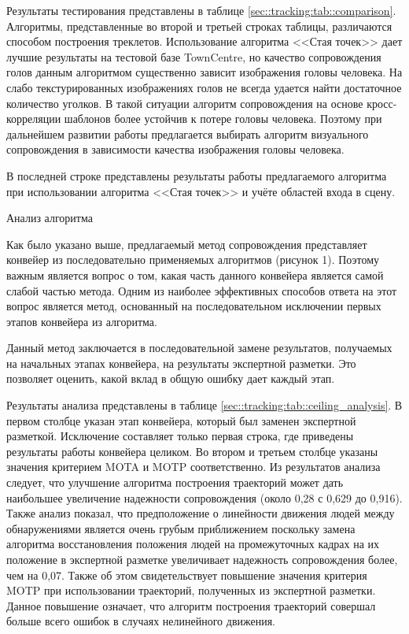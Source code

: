 Результаты тестирования представлены в таблице \ref{sec::tracking:tab::comparison}. Алгоритмы, представленные во второй и третьей строках таблицы, различаются способом построения треклетов. Использование алгоритма <<Стая точек>> дает лучшие результаты на тестовой базе TownCentre, но качество сопровождения голов данным алгоритмом существенно зависит изображения головы человека. На слабо текстурированных изображениях голов не всегда удается найти достаточное количество уголков. В такой ситуации алгоритм сопровождения на основе кросс-корреляции шаблонов более устойчив к потере головы человека. Поэтому при дальнейшем развитии работы предлагается выбирать алгоритм визуального сопровождения в зависимости качества изображения головы человека.

В последней строке представлены результаты работы предлагаемого алгоритма при использовании алгоритма <<Стая точек>> и учёте областей входа в сцену.

Анализ алгоритма

Как было указано выше, предлагаемый метод сопровождения представляет конвейер из последовательно применяемых алгоритмов (рисунок 1). Поэтому важным является вопрос о том, какая часть данного конвейера является самой слабой частью метода. Одним из наиболее эффективных способов ответа на этот вопрос является метод, основанный на последовательном
исключении первых этапов конвейера из алгоритма.

Данный метод заключается в последовательной замене результатов, получаемых на начальных этапах конвейера, на результаты экспертной разметки. Это позволяет оценить, какой вклад в общую ошибку дает каждый этап.

Результаты анализа представлены в таблице \ref{sec::tracking:tab::ceiling_analysis}. В первом столбце указан этап конвейера, который был заменен экспертной разметкой. Исключение составляет только первая строка, где приведены результаты работы конвейера целиком. Во втором и третьем столбце указаны значения критерием MOTA и MOTP соответственно. Из результатов анализа следует, что улучшение алгоритма построения траекторий может дать наибольшее увеличение надежности сопровождения (около 0,28 с 0,629 до 0,916). Также анализ показал, что предположение о линейности движения людей между обнаружениями является очень грубым приближением поскольку замена алгоритма восстановления положения людей на промежуточных кадрах на их положение в экспертной разметке увеличивает надежность сопровождения более, чем на 0,07. Также об этом свидетельствует повышение значения критерия MOTP при использовании траекторий, полученных из экспертной разметки. Данное повышение означает, что алгоритм построения траекторий совершал больше всего ошибок в случаях нелинейного движения.

